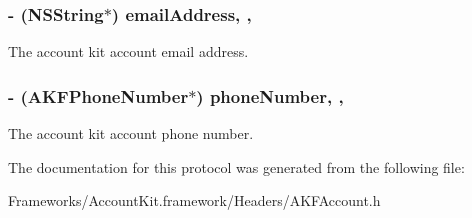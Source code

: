 \subsubsection[{email\+Address}]{\setlength{\rightskip}{0pt plus 5cm}-\/ (N\+S\+String$\ast$) email\+Address\hspace{0.3cm}{\ttfamily [read]}, {\ttfamily [nonatomic]}, {\ttfamily [copy]}}\label{protocol_a_k_f_account-p_a53f940fb4d2e951bef36867a8f455086}
The account kit account email address. \hypertarget{protocol_a_k_f_account-p_abbb9ced6a92928565096ae01428d8751}{}
\subsubsection[{phone\+Number}]{\setlength{\rightskip}{0pt plus 5cm}-\/ ({\bf A\+K\+F\+Phone\+Number}$\ast$) phone\+Number\hspace{0.3cm}{\ttfamily [read]}, {\ttfamily [nonatomic]}, {\ttfamily [copy]}}\label{protocol_a_k_f_account-p_abbb9ced6a92928565096ae01428d8751}
The account kit account phone number. 

The documentation for this protocol was generated from the following file\+:\begin{DoxyCompactItemize}
\item 
Frameworks/\+Account\+Kit.\+framework/\+Headers/A\+K\+F\+Account.\+h\end{DoxyCompactItemize}
